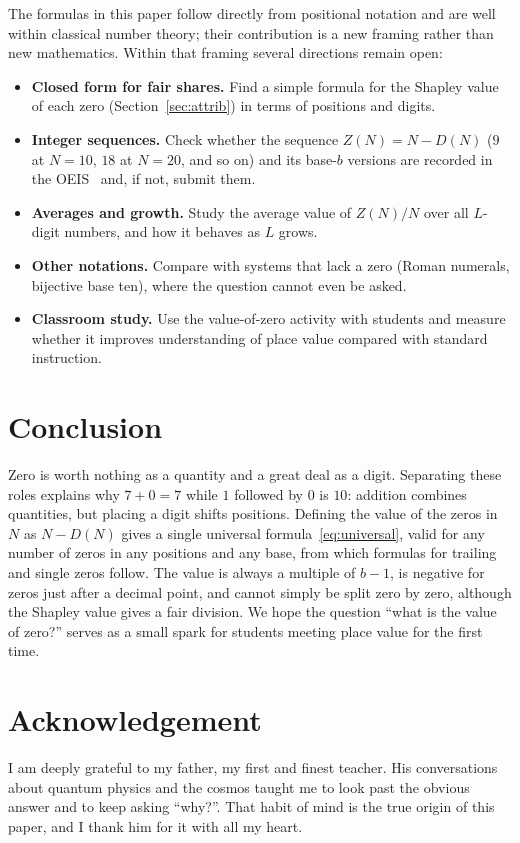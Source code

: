 \documentclass[11pt,a4paper]{article}
\theoremstyle{definition}
\newcommand{\Dz}{D}   %
\newcommand{\Zv}{Z}   %
\begin{document}
The formulas in this paper follow directly from positional notation and are well within classical number theory; their contribution is a new framing rather than new mathematics. Within that framing several directions remain open:
\begin{itemize}[nosep]
  \item \textbf{Closed form for fair shares.} Find a simple formula for the Shapley value of each zero (Section~\ref{sec:attrib}) in terms of positions and digits.
  \item \textbf{Integer sequences.} Check whether the sequence $\Zv(N)=N-\Dz(N)$ ($9$ at $N=10$, $18$ at $N=20$, and so on) and its base-$b$ versions are recorded in the OEIS~\cite{oeis} and, if not, submit them.
  \item \textbf{Averages and growth.} Study the average value of $\Zv(N)/N$ over all $L$-digit numbers, and how it behaves as $L$ grows.
  \item \textbf{Other notations.} Compare with systems that lack a zero (Roman numerals, bijective base ten), where the question cannot even be asked.
  \item \textbf{Classroom study.} Use the value-of-zero activity with students and measure whether it improves understanding of place value compared with standard instruction.
\end{itemize}

\section{Conclusion}

Zero is worth nothing as a quantity and a great deal as a digit. Separating these roles explains why $7+0=7$ while $1$ followed by $0$ is $10$: addition combines quantities, but placing a digit shifts positions. Defining the value of the zeros in $N$ as $N-\Dz(N)$ gives a single universal formula~\eqref{eq:universal}, valid for any number of zeros in any positions and any base, from which formulas for trailing and single zeros follow. The value is always a multiple of $b-1$, is negative for zeros just after a decimal point, and cannot simply be split zero by zero, although the Shapley value gives a fair division. We hope the question ``what is the value of zero?'' serves as a small spark for students meeting place value for the first time.

\section*{Acknowledgement}
I am deeply grateful to my father, my first and finest teacher. His conversations about quantum physics and the cosmos taught me to look past the obvious answer and to keep asking ``why?''. That habit of mind is the true origin of this paper, and I thank him for it with all my heart.
\end{document}

